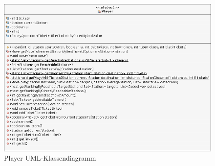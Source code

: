         \begin{figure}[H]
            \centering
            \includegraphics[scale=0.5]{img/uml/player.png}   
            \caption{Player UML-Klassendiagramm}
        \end{figure}


